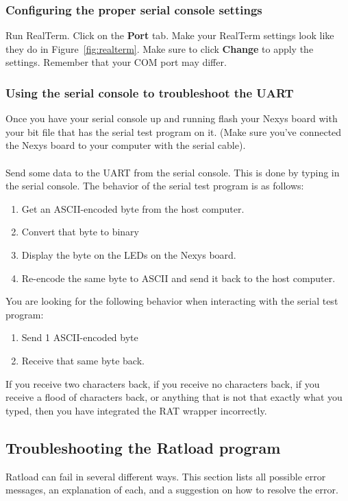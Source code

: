 \documentclass[notitlepage]{article}
\begin{document}
\subsubsection{Configuring the proper serial console settings}
Run RealTerm. Click on the \textbf{Port} tab. Make your RealTerm settings look like they do in Figure~\ref{fig:realterm}. Make sure to click \textbf{Change} to apply the settings. Remember that your COM port may differ.

\subsubsection{Using the serial console to troubleshoot the UART}
Once you have your serial console up and running flash your Nexys board with your bit file that has the serial test program on it. (Make sure you've connected the Nexys board to your computer with the serial cable).\\\\
Send some data to the UART from the serial console. This is done by typing in the serial console. The behavior of the serial test program is as follows:
\begin{enumerate}
\item Get an ASCII-encoded byte from the host computer.
\item Convert that byte to binary
\item Display the byte on the LEDs on the Nexys board.
\item Re-encode the same byte to ASCII and send it back to the host computer.
\end{enumerate}
You are looking for the following behavior when interacting with the serial test program:
\begin{enumerate}
\item Send 1 ASCII-encoded byte
\item Receive that same byte back.
\end{enumerate}
If you receive two characters back, if you receive no characters back, if you receive a flood of characters back, or anything that is not that exactly what you typed, then you have integrated the RAT wrapper incorrectly.

\subsection{Troubleshooting the Ratload program}
Ratload can fail in several different ways. This section lists all possible error messages, an explanation of each, and a suggestion on how to resolve the error.
\end{document}
